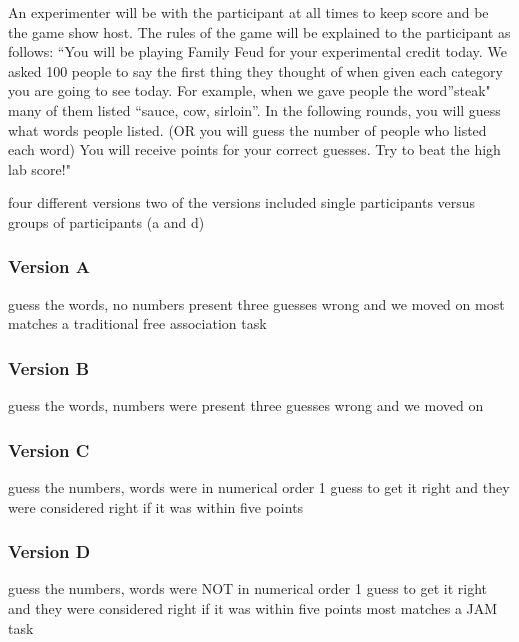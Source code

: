 \documentclass[man]{apa6}
\theoremstyle{definition}
\theoremstyle{definition}
\theoremstyle{definition}
\theoremstyle{remark}
\begin{document}
An experimenter will be with the participant at all times to keep score
and be the game show host. The rules of the game will be explained to
the participant as follows: \enquote{You will be playing Family Feud for
your experimental credit today. We asked 100 people to say the first
thing they thought of when given each category you are going to see
today. For example, when we gave people the word}steak" many of them
listed \enquote{sauce, cow, sirloin}. In the following rounds, you will
guess what words people listed. (OR you will guess the number of people
who listed each word) You will receive points for your correct guesses.
Try to beat the high lab score!"

four different versions two of the versions included single participants
versus groups of participants (a and d)

\subsubsection{Version A}\label{version-a}

guess the words, no numbers present three guesses wrong and we moved on
most matches a traditional free association task

\subsubsection{Version B}\label{version-b}

guess the words, numbers were present three guesses wrong and we moved
on

\subsubsection{Version C}\label{version-c}

guess the numbers, words were in numerical order 1 guess to get it right
and they were considered right if it was within five points

\subsubsection{Version D}\label{version-d}

guess the numbers, words were NOT in numerical order 1 guess to get it
right and they were considered right if it was within five points most
matches a JAM task
\end{document}
